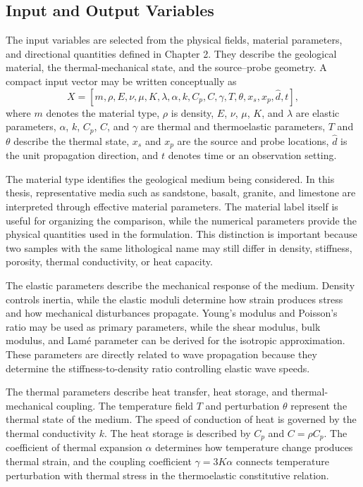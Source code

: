 \subsection{Input and Output Variables}

The input variables are selected from the physical fields, material parameters, and directional quantities defined in Chapter 2. They describe the geological material, the thermal-mechanical state, and the source--probe geometry. A compact input vector may be written conceptually as
\begin{equation}
X
=
\left[
m,\rho,E,\nu,\mu,K,\lambda,\alpha,k,C_p,C,\gamma,
T,\theta,x_s,x_p,\hat{d},t
\right],
\end{equation}
where \(m\) denotes the material type, \(\rho\) is density, \(E\), \(\nu\), \(\mu\), \(K\), and \(\lambda\) are elastic parameters, \(\alpha\), \(k\), \(C_p\), \(C\), and \(\gamma\) are thermal and thermoelastic parameters, \(T\) and \(\theta\) describe the thermal state, \(x_s\) and \(x_p\) are the source and probe locations, \(\hat{d}\) is the unit propagation direction, and \(t\) denotes time or an observation setting.

The material type identifies the geological medium being considered. In this thesis, representative media such as sandstone, basalt, granite, and limestone are interpreted through effective material parameters. The material label itself is useful for organizing the comparison, while the numerical parameters provide the physical quantities used in the formulation. This distinction is important because two samples with the same lithological name may still differ in density, stiffness, porosity, thermal conductivity, or heat capacity.

The elastic parameters describe the mechanical response of the medium. Density controls inertia, while the elastic moduli determine how strain produces stress and how mechanical disturbances propagate. Young's modulus and Poisson's ratio may be used as primary parameters, while the shear modulus, bulk modulus, and Lamé parameter can be derived for the isotropic approximation. These parameters are directly related to wave propagation because they determine the stiffness-to-density ratio controlling elastic wave speeds.

The thermal parameters describe heat transfer, heat storage, and thermal-mechanical coupling. The temperature field \(T\) and perturbation \(\theta\) represent the thermal state of the medium. The speed of conduction of heat is governed by the thermal conductivity \(k\). The heat storage is described by \(C_p\) and \(C=\rho C_p\). The coefficient of thermal expansion \(\alpha\) determines how temperature change produces thermal strain, and the coupling coefficient \(\gamma=3K\alpha\) connects temperature perturbation with thermal stress in the thermoelastic constitutive relation.

